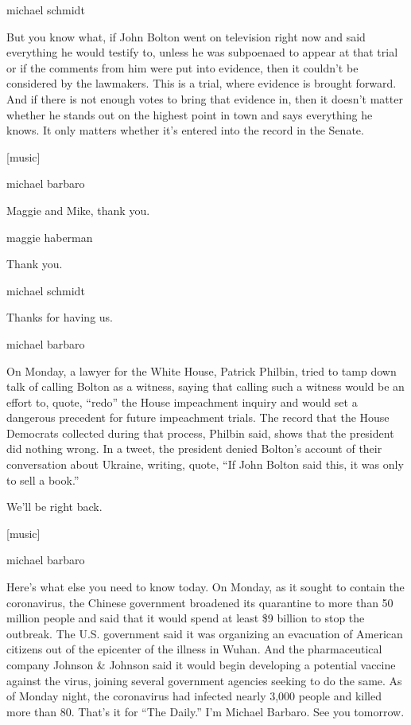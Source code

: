 michael schmidt

But you know what, if John Bolton went on television right now and said
everything he would testify to, unless he was subpoenaed to appear at
that trial or if the comments from him were put into evidence, then it
couldn't be considered by the lawmakers. This is a trial, where evidence
is brought forward. And if there is not enough votes to bring that
evidence in, then it doesn't matter whether he stands out on the highest
point in town and says everything he knows. It only matters whether it's
entered into the record in the Senate.

{[}music{]}

michael barbaro

Maggie and Mike, thank you.

maggie haberman

Thank you.

michael schmidt

Thanks for having us.

michael barbaro

On Monday, a lawyer for the White House, Patrick Philbin, tried to tamp
down talk of calling Bolton as a witness, saying that calling such a
witness would be an effort to, quote, ``redo'' the House impeachment
inquiry and would set a dangerous precedent for future impeachment
trials. The record that the House Democrats collected during that
process, Philbin said, shows that the president did nothing wrong. In a
tweet, the president denied Bolton's account of their conversation about
Ukraine, writing, quote, ``If John Bolton said this, it was only to sell
a book.''

We'll be right back.

{[}music{]}

michael barbaro

Here's what else you need to know today. On Monday, as it sought to
contain the coronavirus, the Chinese government broadened its quarantine
to more than 50 million people and said that it would spend at least \$9
billion to stop the outbreak. The U.S. government said it was organizing
an evacuation of American citizens out of the epicenter of the illness
in Wuhan. And the pharmaceutical company Johnson \& Johnson said it
would begin developing a potential vaccine against the virus, joining
several government agencies seeking to do the same. As of Monday night,
the coronavirus had infected nearly 3,000 people and killed more than
80. That's it for ``The Daily.'' I'm Michael Barbaro. See you tomorrow.

